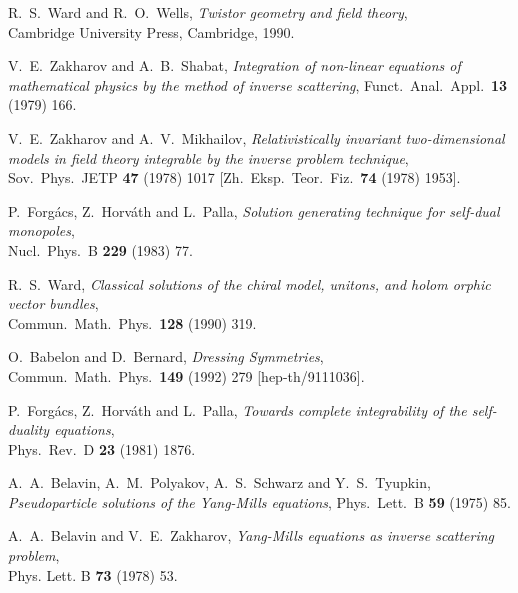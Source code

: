 \documentclass[a4paper,11pt,english]{article}
\numberwithin{equation}{section}
\renewcommand{\=}{\ =\ }
\begin{document}
\begin{thebibliography}{99}
         R.~S.~Ward and R.~O.~Wells,
         {\em Twistor geometry and field theory},\\
         Cambridge University Press, Cambridge, 1990.

         V.~E.~Zakharov and A.~B.~Shabat,
         {\em Integration of non-linear equations of mathematical physics %
 by the method of inverse scattering},
         Funct.\ Anal.\ Appl.\ {\bf 13} (1979) 166.

         V.~E.~Zakharov and A.~V.~Mikhailov,
         {\em Relativistically invariant two-dimensional models in field %
theory integrable by the inverse problem technique},\\
         Sov.\ Phys.\ JETP {\bf 47} (1978) 1017
         [Zh.\ Eksp.\ Teor.\ Fiz.\  {\bf 74} (1978) 1953].

         P.~Forg\'acs, Z.~Horv\'ath and L.~Palla,
         {\em Solution generating technique for self-dual monopoles},\\
         Nucl.\ Phys.\ B {\bf 229} (1983) 77.

         R.~S.~Ward,
         {\em Classical solutions of the chiral model, unitons, and holom%
orphic vector bundles},\\
         Commun.\ Math.\ Phys.\  {\bf 128} (1990) 319.

	 O.~Babelon and D.~Bernard,
	 {\em Dressing Symmetries},\\
	 Commun.\ Math.\ Phys.\  {\bf 149} (1992) 279
	 [hep-th/9111036].

         P.~Forg\'acs, Z.~Horv\'ath and L.~Palla,
         {\em Towards complete integrability of the self-duality equations},\\
         Phys.\ Rev.\ D {\bf 23} (1981) 1876.

         A.~A.~Belavin, A.~M.~Polyakov, A.~S.~Schwarz and Y.~S.~Tyupkin,\\
         {\em Pseudoparticle solutions of the Yang-Mills equations},
         Phys.\ Lett.\ B {\bf 59} (1975) 85.

         A.~A.~Belavin and V.~E.~Zakharov,
         {\em Yang-Mills equations as inverse scattering problem},\\
         Phys. Lett. B {\bf 73} (1978) 53.


\end{thebibliography}
\end{document}
